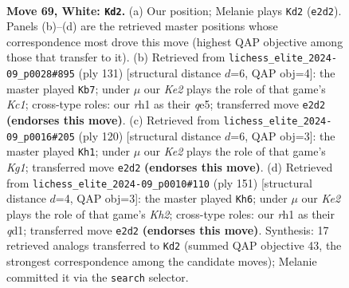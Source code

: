 \documentclass[11pt]{article}
\begin{document}
\clearpage

\begin{figure}[p]\centering
\begin{subfigure}{0.46\textwidth}\centering
\resizebox{\linewidth}{!}{%
\newchessgame
\chessboard[
  setfen={8/3k4/2p5/3p4/p7/8/4K3/7r w - - 0 69},
  showmover=false,
  pgfstyle=straightmove, color=movearrow, markmove={e2-d2}
]}
\caption{}
\end{subfigure}\hfill
\begin{subfigure}{0.46\textwidth}\centering
\resizebox{\linewidth}{!}{%
\newchessgame
\chessboard[
  setfen={2k5/8/8/4QP2/8/1P6/2P5/2K5 b - - 0 66},
  showmover=false,
  pgfstyle=straightmove, color=movearrow, markmove={c8-b7}
]}
\caption{}
\end{subfigure}
\\[4pt]
\begin{subfigure}{0.46\textwidth}\centering
\resizebox{\linewidth}{!}{%
\newchessgame
\chessboard[
  setfen={8/8/6k1/6p1/7p/8/8/6K1 w - - 0 61},
  showmover=false,
  pgfstyle=straightmove, color=movearrow, markmove={g1-h1}
]}
\caption{}
\end{subfigure}\hfill
\begin{subfigure}{0.46\textwidth}\centering
\resizebox{\linewidth}{!}{%
\newchessgame
\chessboard[
  setfen={8/7k/8/8/5P2/6PK/8/3Q4 b - - 0 76},
  showmover=false,
  pgfstyle=straightmove, color=movearrow, markmove={h7-h6}
]}
\caption{}
\end{subfigure}
\caption{\textbf{Move 69, White: \texttt{Kd2}.} (a) Our position; Melanie plays \texttt{Kd2} (\texttt{e2d2}). Panels (b)--(d) are the retrieved master positions whose correspondence most drove this move (highest QAP objective among those that transfer to it). (b) Retrieved from \texttt{lichess\_elite\_2024-09\_p0028\#895} (ply 131) [structural distance $d$=6, QAP obj=4]: the master played \texttt{Kb7}; under $\mu$ our \emph{Ke2} plays the role of that game's \emph{Kc1}; cross-type roles: our \emph{r}h1 as their \emph{q}e5; transferred move \texttt{e2d2} \textbf{(endorses this move)}. (c) Retrieved from \texttt{lichess\_elite\_2024-09\_p0016\#205} (ply 120) [structural distance $d$=6, QAP obj=3]: the master played \texttt{Kh1}; under $\mu$ our \emph{Ke2} plays the role of that game's \emph{Kg1}; transferred move \texttt{e2d2} \textbf{(endorses this move)}. (d) Retrieved from \texttt{lichess\_elite\_2024-09\_p0010\#110} (ply 151) [structural distance $d$=4, QAP obj=3]: the master played \texttt{Kh6}; under $\mu$ our \emph{Ke2} plays the role of that game's \emph{Kh2}; cross-type roles: our \emph{r}h1 as their \emph{q}d1; transferred move \texttt{e2d2} \textbf{(endorses this move)}. Synthesis: 17 retrieved analogs transferred to \texttt{Kd2} (summed QAP objective 43, the strongest correspondence among the candidate moves); Melanie committed it via the \texttt{search} selector.}
\label{fig:thought-m136}
\end{figure}
\end{document}
